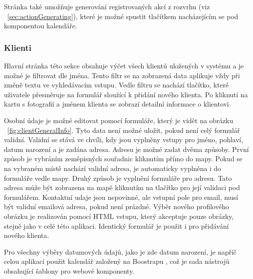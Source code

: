\documentclass[
  biblatex,
  glossaries,
  index
]{kidiplom}
\begin{document}
Stránka také umožňuje generování registrovaných akcí z rozvrhu (viz ~\ref{sec:actionGenerating}), které je možné spustit tlačítkem nacházejícím se pod komponentou kalendáře.

\subsubsection{Klienti}
Hlavní stránka této sekce obsahuje výčet všech klientů uložených v systému a je možné je filtrovat dle jména. Tento filtr se na zobrazená data aplikuje vždy při změně textu ve vyhledávacím vstupu. Vedle filtru se nachází tlačítko, které uživatele přesměruje na formulář sloužící k přidání nového klienta. Po kliknutí na kartu s fotografií a jménem klienta se zobrazí detailní informace o klientovi. 

Osobní údaje je možné editovat pomocí formuláře, který je vidět na obrázku ~\ref{fig:clientGeneralInfo}. Tyto data není možné uložit, pokud není celý formulář validní. Validní se stává ve chvíli, kdy jsou vyplněny vstupy pro jméno, pohlaví, datum narození a je zadána adresa. Adresu je možné zadat dvěma způsoby. První způsob je vybráním zeměpisných souřadnic kliknutím přímo do mapy. Pokud se na vybraném místě nachází validní adresa, je automaticky vyplněna i do formuláře vedle mapy. Druhý způsob je vyplnění formuláře pro adresu. Tato adresa může být zobrazena na mapě kliknutím na tlačítko pro její validaci pod formulářem. Kontaktní udaje jsou nepovinné, ale vstupní pole pro email, musí být validní emailová adresa, pokud není prázdné. Výběr nového profilového obrázku je realizován pomocí HTML vstupu, který akceptuje pouze obrázky, stejně jako v celé této aplikaci. Identický formulář je použit i pro přidávání nového klienta.

Pro všechny výběry datumových údajů, jako je zde datum narození, je napříč celou aplikací použit kalendář založený na Boostrapu \cite{15}, což je sada nástrojů obsahující šablony pro webové komponenty.
\end{document}
